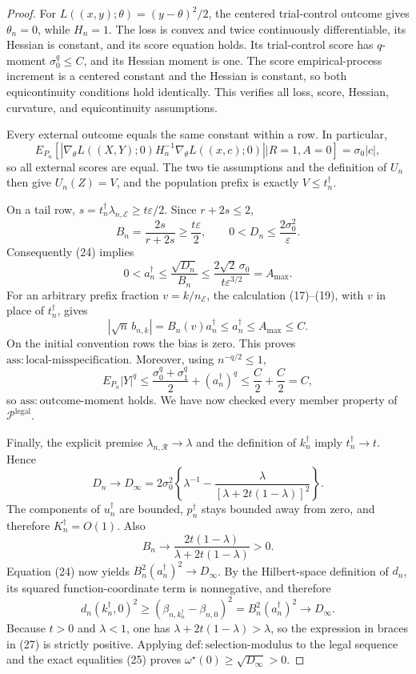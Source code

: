 \documentclass{article}
\begin{document}
\begin{proof}
For \(L((x,y);\theta)=(y-\theta)^2/2\), the centered trial-control outcome gives \(\theta_n=0\), while \(H_n=1\).  The loss is convex and twice continuously differentiable, its Hessian is constant, and its score equation holds.  Its trial-control score has \(q\)-moment \(\sigma_0^q\leq C\), and its Hessian moment is one.  The score empirical-process increment is a centered constant and the Hessian is constant, so both equicontinuity conditions hold identically.  This verifies all loss, score, Hessian, curvature, and equicontinuity assumptions.

Every external outcome equals the same constant within a row.  In particular,
\[
 E_{P_n}\!\left[
 \left|\nabla_\theta L((X,Y);0)H_n^{-1}
 \nabla_\theta L((x,c);0)\right|
 \mathrel{\big|}R=1,A=0\right]
 =\sigma_0|c|,
\]
so all external scores are equal.  The two tie assumptions and the definition of \(U_n\) then give \(U_n(Z)=V\), and the population prefix is exactly \(V\leq t_n^{\dagger}\).

On a tail row, \(s=t_n^{\dagger}\lambda_{n,\mathcal E}\geq t\varepsilon/2\).  Since \(r+2s\leq2\),
\[
 B_n=\frac{2s}{r+2s}\geq\frac{t\varepsilon}{2},
 \qquad
 0<D_n\leq\frac{2\sigma_0^2}{\varepsilon}.
\]
Consequently (24) implies
\[
 0<a_n^{\dagger}\leq\frac{\sqrt{D_n}}{B_n}
 \leq\frac{2\sqrt2\,\sigma_0}{t\varepsilon^{3/2}}
 =A_{\max}.
\tag{26}
\]
For an arbitrary prefix fraction \(v=k/n_{\mathcal E}\), the calculation (17)--(19), with \(v\) in place of \(t_n^{\dagger}\), gives
\[
 |\sqrt n\,b_{n,k}|=B_n(v)a_n^{\dagger}\leq a_n^{\dagger}\leq A_{\max}\leq C.
\]
On the initial convention rows the bias is zero.  This proves \(\mathrm{ass:local\text{-}misspecification}\).  Moreover, using \(n^{-q/2}\leq1\),
\[
 E_{P_n}|Y|^q
 \leq \frac{\sigma_0^q+\sigma_1^q}{2}
      +(a_n^{\dagger})^q
 \leq \frac C2+\frac C2=C,
\]
so \(\mathrm{ass:outcome\text{-}moment}\) holds.  We have now checked every member property of \(\mathcal P^{\mathrm{legal}}\).

Finally, the explicit premise \(\lambda_{n,\mathcal R}\to\lambda\) and the definition of \(k_n^{\dagger}\) imply \(t_n^{\dagger}\to t\).  Hence
\[
 D_n\longrightarrow
 D_\infty
 =2\sigma_0^2\left\{\lambda^{-1}
 -\frac{\lambda}{[\lambda+2t(1-\lambda)]^2}\right\}.
\tag{27}
\]
The components of \(u_n^{\dagger}\) are bounded, \(p_n^{\dagger}\) stays bounded away from zero, and therefore \(K_n^{\dagger}=O(1)\).  Also
\[
 B_n\longrightarrow
 \frac{2t(1-\lambda)}{\lambda+2t(1-\lambda)}>0.
\]
Equation (24) now yields \(B_n^2(a_n^{\dagger})^2\to D_\infty\).  By the Hilbert-space definition of \(d_n\), its squared function-coordinate term is nonnegative, and therefore
\[
 d_n(k_n^{\dagger},0)^2
 \geq(\beta_{n,k_n^{\dagger}}-\beta_{n,0})^2
 =B_n^2(a_n^{\dagger})^2
 \longrightarrow D_\infty.
\tag{28}
\]
Because \(t>0\) and \(\lambda<1\), one has \(\lambda+2t(1-\lambda)>\lambda\), so the expression in braces in (27) is strictly positive.  Applying \(\mathrm{def:selection\text{-}modulus}\) to the legal sequence and the exact equalities (25) proves \(\omega^{\star}(0)\geq\sqrt{D_\infty}>0\).
\end{proof}
\end{document}
